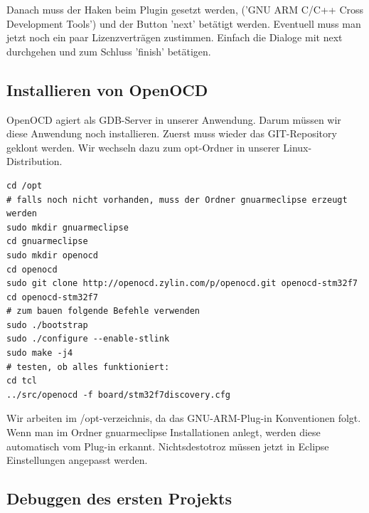 \documentclass[12pt,a4paper]{article}
\begin{document}
Danach muss der Haken beim Plugin gesetzt werden, ('GNU ARM C/C++ Cross Development Tools') und der Button 'next' betätigt werden. Eventuell muss man jetzt noch ein paar Lizenzverträgen zustimmen. Einfach die Dialoge mit next durchgehen und zum Schluss 'finish' betätigen.
\subsection{Installieren von OpenOCD}
OpenOCD agiert als GDB-Server in unserer Anwendung. Darum müssen wir diese Anwendung noch installieren.
Zuerst muss wieder das GIT-Repository geklont werden. Wir wechseln dazu zum opt-Ordner in unserer Linux-Distribution.
\begin{lstlisting}
cd /opt
# falls noch nicht vorhanden, muss der Ordner gnuarmeclipse erzeugt werden
sudo mkdir gnuarmeclipse
cd gnuarmeclipse
sudo mkdir openocd
cd openocd
sudo git clone http://openocd.zylin.com/p/openocd.git openocd-stm32f7
cd openocd-stm32f7
# zum bauen folgende Befehle verwenden
sudo ./bootstrap
sudo ./configure --enable-stlink
sudo make -j4
# testen, ob alles funktioniert:
cd tcl
../src/openocd -f board/stm32f7discovery.cfg
\end{lstlisting}
Wir arbeiten im /opt-verzeichnis, da das GNU-ARM-Plug-in Konventionen folgt. Wenn man im Ordner gnuarmeclipse Installationen anlegt, werden diese automatisch vom Plug-in erkannt.
Nichtsdestotroz müssen jetzt in Eclipse Einstellungen angepasst werden.
 

\subsection{Debuggen des ersten Projekts}
\end{document}
